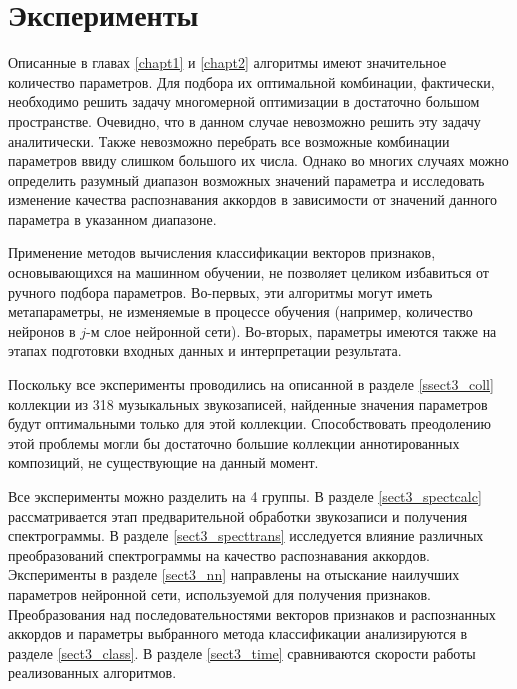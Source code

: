 \chapter{Эксперименты} \label{chapt3}

Описанные в главах \ref{chapt1} и \ref{chapt2} алгоритмы имеют значительное
количество параметров. Для подбора их оптимальной комбинации, фактически,
необходимо решить задачу многомерной оптимизации в достаточно большом
пространстве. Очевидно, что в данном случае невозможно решить эту задачу
аналитически. Также невозможно перебрать все возможные комбинации параметров
ввиду слишком большого их числа. Однако во многих случаях можно определить
разумный диапазон возможных значений параметра и исследовать изменение качества
распознавания аккордов в зависимости от значений данного параметра в указанном
диапазоне.

Применение методов вычисления классификации векторов признаков, основывающихся
на машинном обучении, не позволяет целиком избавиться от ручного подбора
параметров. Во-первых, эти алгоритмы могут иметь метапараметры, не изменяемые в
процессе обучения (например, количество нейронов в $j$-м слое нейронной сети).
Во-вторых, параметры имеются также на этапах подготовки входных данных и
интерпретации результата.

Поскольку все эксперименты проводились на описанной в разделе \ref{ssect3_coll}
коллекции из 318 музыкальных звукозаписей, найденные значения параметров будут
оптимальными только для этой коллекции. Способствовать преодолению этой проблемы
могли бы достаточно большие коллекции аннотированных композиций, не существующие
на данный момент.

Все эксперименты можно разделить на 4 группы. В разделе \ref{sect3_spectcalc}
рассматривается этап предварительной обработки звукозаписи и получения
спектрограммы. В разделе \ref{sect3_specttrans} исследуется влияние различных
преобразований спектрограммы на качество распознавания аккордов. Эксперименты
в разделе \ref{sect3_nn} направлены на отыскание наилучших параметров нейронной
сети, используемой для получения признаков. Преобразования над
последовательностями векторов признаков и распознанных аккордов и параметры
выбранного метода классификации анализируются в разделе \ref{sect3_class}. В
разделе \ref{sect3_time} сравниваются скорости работы реализованных алгоритмов.

